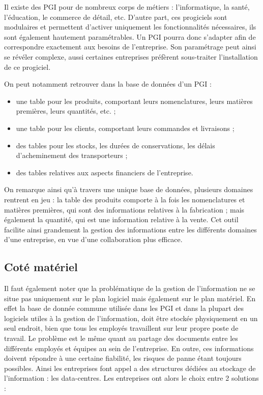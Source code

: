 Il existe des PGI pour de nombreux corps de métiers : l'informatique, la santé, l'éducation, le commerce de détail, etc. D'autre part, ces progiciels sont modulaires et permettent d'activer uniquement les fonctionnalités nécessaires, ils sont également hautement paramétrables. Un PGI pourra donc s'adapter afin de correspondre exactement aux besoins de l'entreprise. Son paramétrage peut ainsi se révéler complexe, aussi certaines entreprises préfèrent sous-traiter l'installation de ce progiciel.

On peut notamment retrouver dans la base de données d'un PGI :

\begin{itemize}
\item une table pour les produits, comportant leurs nomenclatures, leurs matières premières, leurs quantités, etc. ;
\item une table pour les clients, comportant leurs commandes et livraisons ;
\item des tables pour les stocks, les durées de conservations, les délais d'acheminement des transporteurs ;
\item des tables relatives aux aspects financiers de l'entreprise.
\end{itemize}

On remarque ainsi qu'à travers une unique base de données, plusieurs domaines rentrent en jeu : la table des produits comporte à la fois les nomenclatures et matières premières, qui sont des informations relatives à la fabrication ; mais également la quantité, qui est une information relative à la vente. Cet outil facilite ainsi grandement la gestion des informations entre les différents domaines d'une entreprise, en vue d'une collaboration plus efficace.

\subsection{Coté matériel}

Il faut également noter que la problématique de la gestion de l'information ne se situe pas uniquement sur le plan logiciel mais également sur le plan matériel. En effet la base de donnée commune utilisée dans les PGI et dans la plupart des logiciels utiles à la gestion de l'information, doit être stockée physiquement en un seul endroit, bien que tous les employés travaillent sur leur propre poste de travail. Le problème est le même quant au partage des documents entre les différents employés et équipes au sein de l'entreprise. En outre, ces informations doivent répondre à une certaine fiabilité, les risques de panne étant toujours possibles. Ainsi les entreprises font appel a des structures dédiées au stockage de l'information : les data-centres. Les entreprises ont alors le choix entre 2 solutions :

